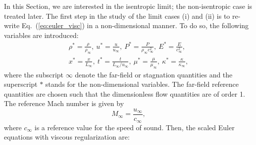 \documentclass[preprint,10pt]{elsarticle}
\newcommand{\eqt}[1]{Eq.~(\ref{#1})}                     %
\newcommand{\sct}[1]{Section~\ref{#1}}                   %
\newcommand{\tcr}[1]{\textcolor{red}{#1}}
\begin{document}
In this Section, we are interested in the isentropic limit; the non-isentropic case is treated later.
%
The first step in the study of the limit cases (i) and (ii) is to re-write \eqt{eq:euler_visc} in a non-dimensional manner. To do so, the following variables are introduced:
%
\begin{multline}
\label{eq:norm_param}
\rho^*   = \frac{\rho}{\rho_\infty}           ,\
u^*      = \frac{u}{u_\infty}                 ,\
P^*      = \frac{P}{\rho_\infty c^2_\infty}   ,\
E^*      = \frac{E}{c^2_\infty }              ,\\
x^* = \frac{x}{L_\infty}                      ,\
t^* = \frac{t}{L_\infty / u_\infty}           ,\ 
\mu^*    = \frac{\mu}{\mu_\infty}             ,\
\kappa^* = \frac{\kappa}{\kappa_\infty}       ,
\end{multline}
%
where  the subscript $\infty$ denote the far-field or stagnation quantities and the superscript $*$ stands for the non-dimensional variables. The far-field reference quantities are chosen such that the dimensionless flow quantities are of order 1. The reference Mach number is given by
%
\begin{equation}
M_\infty = \frac{u_\infty}{c_\infty} ,
\end{equation}
%
where $c_\infty$ is a reference value for the speed of sound. Then, the scaled Euler equations with viscous regularization are:
%
\end{document}
